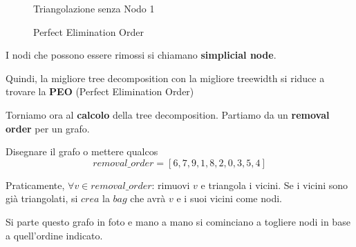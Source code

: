\begin{definition}
    \begin{figure}[H]
        \begin{center}
        \end{center}
        \caption{Triangolazione senza Nodo 1}
    \end{figure}

    \begin{figure}[H]
        \begin{center}
        \end{center}
        \caption{Perfect Elimination Order}
    \end{figure}

    I nodi che possono essere rimossi si chiamano \textbf{simplicial node}.

    Quindi, la migliore tree decomposition con la migliore treewidth si riduce a
    trovare la \textbf{PEO} (Perfect Elimination Order)
\end{definition}

Torniamo ora al \textbf{calcolo} della tree decomposition. Partiamo da un
\textbf{removal order} per un grafo.

Disegnare il grafo o mettere qualcos
\[
    removal\_order = [6,7,9,1,8,2,0,3,5,4]
\]

Praticamente, $\forall v \in removal\_order$: rimuovi $v$ e triangola i vicini.
Se i vicini sono già triangolati, si $crea$ la $bag$ che avrà $v$ e i suoi
vicini come nodi.

Si parte questo grafo in foto e mano a mano si cominciano a togliere nodi in
base a quell'ordine indicato.

